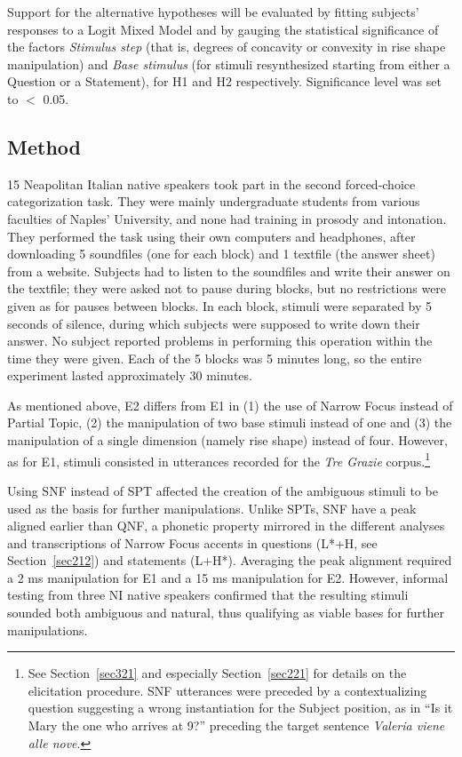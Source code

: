 Support for the alternative hypotheses will be evaluated by fitting subjects' responses to a Logit Mixed Model and by gauging the statistical significance of the factors \textit{Stimulus step} (that is, degrees of concavity or convexity in rise shape manipulation) and \textit{Base stimulus} (for stimuli resynthesized starting from either a Question or a Statement), for H1 and H2 respectively. Significance level was set to $<$ 0.05.

\subsection{Method}\label{sec331}
15 Neapolitan Italian native speakers took part in the second forced-choice categorization task. They were mainly undergraduate students from various faculties of Naples' University, and none had training in prosody and intonation. They performed the task using their own computers and headphones, after downloading 5 soundfiles (one for each block) and 1 textfile (the answer sheet) from a website.
Subjects had to listen to the soundfiles and write their answer on the textfile; they were asked not to pause during blocks, but no restrictions were given as for pauses between blocks. In each block, stimuli were separated by 5 seconds of silence, during which subjects were supposed to write down their answer. No subject reported problems in performing this operation within the time they were given. Each of the 5 blocks was 5 minutes long, so the entire experiment lasted approximately 30 minutes. 

As mentioned above, E2 differs from E1 in (1) the use of Narrow Focus instead of Partial Topic, (2) the manipulation of two base stimuli instead of one and (3) the manipulation of a single dimension (namely rise shape) instead of four. However, as for E1, stimuli consisted in utterances recorded for the \textit{Tre Grazie} corpus.\footnote{See Section~\ref{sec321} and especially Section~\ref{sec221} for details on the elicitation procedure. SNF utterances were preceded by a contextualizing question suggesting a wrong instantiation for the Subject position, as in ``Is it Mary the one who arrives at 9?'' preceding the target sentence \textit{Valeria viene alle nove}.}

Using SNF instead of SPT affected the creation of the ambiguous stimuli to be used as the basis for further manipulations. Unlike SPTs, SNF have a peak aligned earlier than QNF, a phonetic property mirrored in the different analyses and transcriptions of Narrow Focus accents in questions (L*+H, see Section~\ref{sec212}) and statements (L+H*). Averaging the peak alignment required a 2 ms manipulation for E1 and a 15 ms manipulation for E2. However, informal testing from three NI native speakers confirmed that the resulting stimuli sounded both ambiguous and natural, thus qualifying as viable bases for further manipulations.

